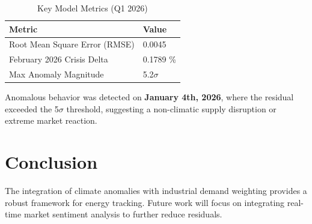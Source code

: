 \documentclass[11pt,a4paper,oneside]{article}
\begin{document}
\begin{table}[h]
    \centering
    \caption{Key Model Metrics (Q1 2026)}
    \begin{tabular}{ll}
        \toprule
        Metric & Value \\
        \midrule
        Root Mean Square Error (RMSE) & 0.0045 \\
        February 2026 Crisis Delta & 0.1789 \% \\
        Max Anomaly Magnitude & 5.2$\sigma$ \\
        \bottomrule
    \end{tabular}
    \label{tab:results}
\end{table}

Anomalous behavior was detected on \textbf{January 4th, 2026}, where the residual exceeded the 5$\sigma$ threshold, suggesting a non-climatic supply disruption or extreme market reaction.

\section{Conclusion}
The integration of climate anomalies with industrial demand weighting provides a robust framework for energy tracking. Future work will focus on integrating real-time market sentiment analysis to further reduce residuals.
\end{document}
